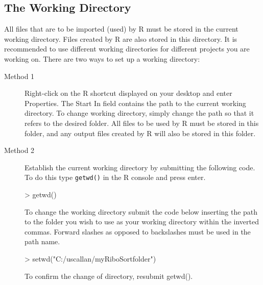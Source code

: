 \documentclass[a4paper]{article}
\begin{document}
\subsection{The Working Directory}
All files that are to be imported (used) by R must be stored in the current working directory. Files created by R are also stored in this directory. It is recommended to use different working directories for different projects you are working on. There are two ways to set up a working directory:
\begin{description}
\item[Method 1]
Right-click on the R shortcut displayed on your desktop and enter Properties. The Start In field contains the path to the current working directory. To change working directory, simply change the path so that it refers to the desired folder. All files to be used by R must be stored in this folder, and any output files created by R will also be stored in this folder.
\item[Method 2]
Establish the current working directory by submitting the following code. To do this type \texttt{getwd()} in the R console and press enter.

\begin{Schunk}
\begin{Sinput}
> getwd()
\end{Sinput}
\end{Schunk}
To change the working directory submit the code below inserting the path to the folder you wish to use as your working directory within the inverted commas. Forward slashes as opposed to backslashes must be used in the path name.

\begin{Schunk}
\begin{Sinput}
> setwd("C:/uscallan/myRiboSortfolder")
\end{Sinput}
\end{Schunk}
To confirm the change of directory, resubmit getwd(). 
\end{description}
\end{document}
